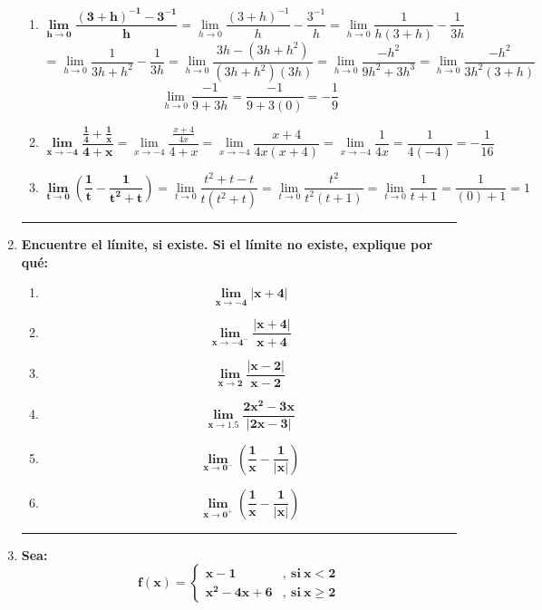 \documentclass[12pt]{article}
\begin{document}
\begin{enumerate}[label=\textbf{\arabic*.}]
\begin{enumerate}[label=\textbf{\arabic*)}]
                    \item \[\bm{\lim_{h \to 0} \frac{(3 + h)^{-1} - 3^{-1}}{h}} = \lim_{h \to 0} \frac{(3 + h)^{-1}}{h} - \frac{3^{-1}}{h} = \lim_{h \to 0} \frac{1}{h(3 + h)} - \frac{1}{3h}\] \[= \lim_{h \to 0} \frac{1}{3h + h^2} - \frac{1}{3h} = \lim_{h \to 0} \frac{3h - (3h + h^2)}{(3h + h^2)(3h)} = \lim_{h \to 0} \frac{-h^2}{9h^2 +3h^3} = \lim_{h \to 0} \frac{-h^2}{3h^2(3 + h)}\] \[\lim_{h \to 0} \frac{-1}{9 + 3h} = \frac{-1}{9 + 3(0)} = -\frac{1}{9}\]
                    \item \[\bm{\lim_{x \to -4} \frac{\frac{1}{4} + \frac{1}{x}}{4 + x}} = \lim_{x \to -4} \frac{\frac{x + 4}{4x}}{4 + x} = \lim_{x \to -4} \frac{x + 4}{4x(x + 4)} = \lim_{x \to -4} \frac{1}{4x} = \frac{1}{4(-4)} = -\frac{1}{16}\]
                    \item \[\bm{\lim_{t \to 0} \left(\frac{1}{t} - \frac{1}{t ^2 + t}\right)} = \lim_{t \to 0} \frac{t ^2 + t - t}{t(t ^2 + t)} = \lim_{t \to 0} \frac{t^2}{t^2(t + 1)} = \lim_{t \to 0} \frac{1}{t + 1} = \frac{1}{(0) + 1} = 1\] 
                \end{enumerate}
            
            \vspace{1cm}\hrule
            \item \textbf{Encuentre el límite, si existe. Si el límite no existe, explique por qué:}
                \begin{enumerate}[label=\textbf{\arabic*)}] 
                    \item \[\bm{\lim_{x \to -4} \left| x + 4 \right|}\]
                    \item \[\bm{\lim_{x \to -4 ^-} \frac{\left| x + 4 \right|}{x + 4}}\]
                    \item \[\bm{\lim_{x \to 2} \frac{\left| x - 2 \right|}{x - 2}}\]
                    \item \[\bm{\lim_{x \to 1.5} \frac{2x ^2 - 3x}{\left| 2x - 3 \right|}}\]
                    \item \[\bm{\lim_{x \to 0 ^-} \left(\frac{1}{x} - \frac{1}{\left| x \right|}\right)}\]
                    \item \[\bm{\lim_{x \to 0 ^+} \left(\frac{1}{x} - \frac{1}{\left| x \right|}\right)}\]
                \end{enumerate}


            \vspace{1cm}\hrule
            \item \textbf{Sea: }
                \[
                    \boldsymbol{
                        f(x) = 
                        \left\{
                            \begin{array}{ll}
                                x - 1 & ,\ \text{si} \ x < 2 \\
                                x ^2 - 4x + 6 & ,\ \text{si} \ x \geq 2
                            \end{array}
                        \right.
                    }
                \]


\end{enumerate}
\end{document}
